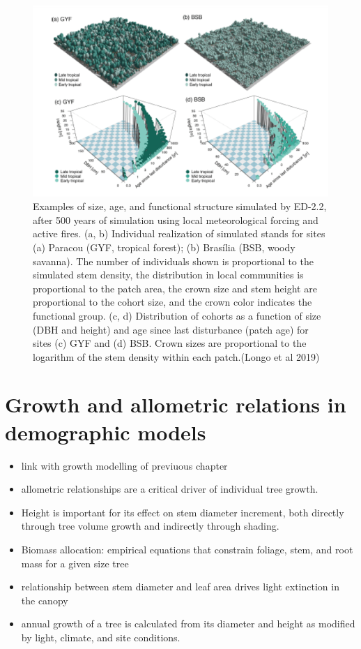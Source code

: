 \documentclass[12pt,oneside]{book}
\providecommand{\tightlist}{%
  \setlength{\itemsep}{0pt}\setlength{\parskip}{0pt}}
\begin{document}
\begin{figure}

{\centering \includegraphics[width=0.8\linewidth]{figures/chap6/f619_ED_amazon} 

}

\caption{ Examples of size, age, and functional structure simulated by ED-2.2, after 500 years of simulation using local meteorological forcing and active fires. (a, b) Individual realization of simulated stands for sites (a) Paracou (GYF, tropical forest); (b) Brasília (BSB, woody savanna). The number of individuals shown is proportional to the simulated stem density, the distribution in local communities is proportional to the patch area, the crown size and stem height are proportional to the cohort size, and the crown color indicates the functional group. (c, d) Distribution of cohorts as a function of size (DBH and height) and age since last disturbance (patch age) for sites (c) GYF and (d) BSB. Crown sizes are proportional to the logarithm of the stem density within each patch.(Longo et al 2019)}\label{fig:f619}
\end{figure}

\section{Growth and allometric relations in demographic
models}\label{growth-and-allometric-relations-in-demographic-models}

\begin{itemize}
\tightlist
\item
  link with growth modelling of previuous chapter
\item
  allometric relationships are a critical driver of individual tree
  growth.
\item
  Height is important for its effect on stem diameter increment, both
  directly through tree volume growth and indirectly through shading.
\item
  Biomass allocation: empirical equations that constrain foliage, stem,
  and root mass for a given size tree
\item
  relationship between stem diameter and leaf area drives light
  extinction in the canopy
\item
  annual growth of a tree is calculated from its diameter and height as
  modified by light, climate, and site conditions.
\end{itemize}
\end{document}
